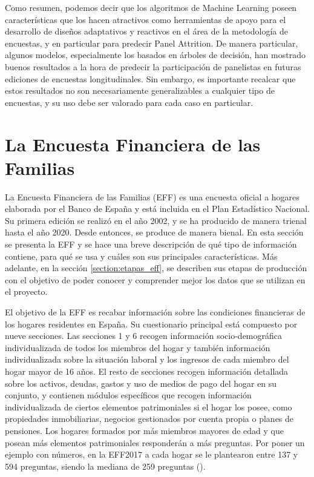 Como resumen, podemos decir que los algoritmos de Machine Learning poseen características que los hacen atractivos como herramientas de apoyo para el desarrollo de diseños adaptativos y reactivos en el área de la metodología de encuestas, y en particular para predecir Panel Attrition. De manera particular, algunos modelos, especialmente los basados en árboles de decisión, han mostrado buenos resultados a la hora de predecir la participación de panelistas en futuras ediciones de encuestas longitudinales. Sin embargo, es importante recalcar que estos resultados no son necesariamente generalizables a cualquier tipo de encuestas, y su uso debe ser valorado para cada caso en particular.

\section{La Encuesta Financiera de las Familias}
\label{section:eff}

La Encuesta Financiera de las Familias (EFF) es una encuesta oficial a hogares elaborada por el Banco de España y está incluida en el Plan Estadístico Nacional. Su primera edición se realizó en el año 2002, y se ha producido de manera trienal hasta el año 2020. Desde entonces, se produce de manera bienal. En esta sección se presenta la EFF y se hace una breve descripción de qué tipo de información contiene, para qué se usa y cuáles son sus principales características. Más adelante, en la sección \ref{section:etapas_eff}, se describen sus etapas de producción con el objetivo de poder conocer y comprender mejor los datos que se utilizan en el proyecto.

El objetivo de la EFF es recabar información sobre las condiciones financieras de los hogares residentes en España. Su cuestionario principal está compuesto por nueve secciones. Las secciones 1 y 6 recogen información socio-demográfica individualizada de todos los miembros del hogar y también información individualizada sobre la situación laboral y los ingresos de cada miembro del hogar mayor de 16 años. El resto de secciones recogen información detallada sobre los activos, deudas, gastos y uso de medios de pago del hogar en su conjunto, y contienen módulos específicos que recogen información individualizada de ciertos elementos patrimoniales si el hogar los posee, como propiedades inmobiliarias, negocios gestionados por cuenta propia o planes de pensiones. Los hogares formados por más miembros mayores de edad y que posean más elementos patrimoniales responderán a más preguntas. Por poner un ejemplo con números, en la EFF2017 a cada hogar se le plantearon entre 137 y 594 preguntas, siendo la mediana de 259 preguntas (\cite{effmethod2017}).

